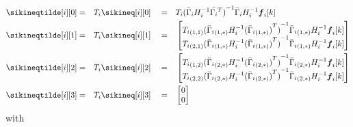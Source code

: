 \documentclass[../main.tex]{subfiles}
\begin{document}
\begin{align}
  \sikineqtilde[i][0]&=&&T_{i}\sikineq[i][0]&&=&&T_{i}{(\linearcoefi)}^{-1}\bar{\Gamma}_{i}H_{i}^{-1}\vec{f}_{i}[k]\\
  \sikineqtilde[i][1]&=&&T_{i} \sikineq[i][1]&&=&& \left[
                                                   \begin{matrix}
                                                     \elem[1,1]{T_{i}}{{(\linearcoefiineqnonzero[1,*])}^{-1}}\elem[1,*]{\bar{\Gamma}_{i}}H_{i}^{-1}\vec{f}_{i}[k]\\
                                                     \elem[2,1]{T_{i}}{{(\linearcoefiineqnonzero[1,*])}^{-1}}\elem[1,*]{\bar{\Gamma}_{i}}H_{i}^{-1}\vec{f}_{i}[k]\\
                                                   \end{matrix}
  \right]\\
  \sikineqtilde[i][2]&=&&T_{i} \sikineq[i][2]&&=&& \left[
                                                   \begin{matrix}
                                                     \elem[1,2]{T_{i}}{{(\linearcoefiineqnonzero[2,*])}^{-1}}\elem[2,*]{\bar{\Gamma}_{i}}H_{i}^{-1}\vec{f}_{i}[k]\\
                                                     \elem[2,2]{T_{i}}{{(\linearcoefiineqnonzero[2,*])}^{-1}}\elem[2,*]{\bar{\Gamma}_{i}}H_{i}^{-1}\vec{f}_{i}[k]\\
                                                   \end{matrix}
  \right]
  \\
  \sikineqtilde[i][3]&=&&T_{i}\sikineq[i][3] &&=&&\left[
                                                   \begin{matrix}
                                                     0\\ 0
                                                   \end{matrix}
  \right]
\end{align}
with
\end{document}
